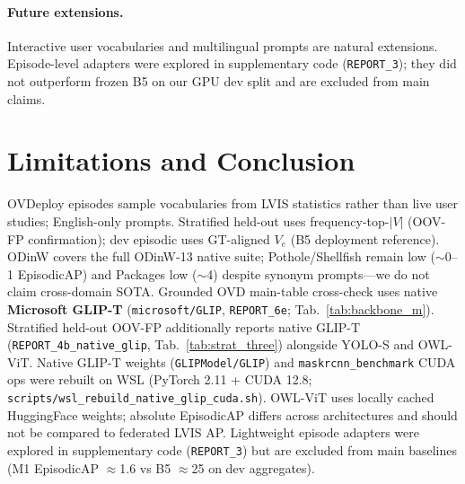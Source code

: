 \documentclass[10pt,twocolumn,letterpaper]{article}
\begin{document}
\begin{table}[t]
\centering
\small

\caption{YOLO-World v2-S vs OWL-ViT-B/32 on OVDeploy dev (GPU v2, \texttt{REPORT\_6}).}
\label{tab:backbone}
\end{table}

\begin{table}[t]
\centering
\scriptsize
\setlength{\tabcolsep}{2pt}
\resizebox{\linewidth}{!}{%
%
}
\caption{YOLO-S vs OWL-ViT vs native GLIP-T (\texttt{REPORT\_6e}) on OVDeploy dev (GPU v2).}
\label{tab:backbone_m}
\end{table}

\paragraph{Future extensions.}
Interactive user vocabularies and multilingual prompts are natural extensions.
Episode-level adapters were explored in supplementary code (\texttt{REPORT\_3}); they did not outperform frozen B5 on our GPU dev split and are excluded from main claims.

\section{Limitations and Conclusion}
\label{sec:lim}

OVDeploy episodes sample vocabularies from LVIS statistics rather than live user studies; English-only prompts.
Stratified held-out uses frequency-top-$|V|$ (OOV-FP confirmation); dev episodic uses GT-aligned $V_e$ (B5 deployment reference).
ODinW covers the full ODinW-13 native suite; Pothole/Shellfish remain low ($\sim$0--1 EpisodicAP) and Packages low ($\sim$4) despite synonym prompts---we do not claim cross-domain SOTA.
Grounded OVD main-table cross-check uses native \textbf{Microsoft GLIP-T} (\texttt{microsoft/GLIP}, \texttt{REPORT\_6e}; Tab.~\ref{tab:backbone_m}).
Stratified held-out OOV-FP additionally reports native GLIP-T (\texttt{REPORT\_4b\_native\_glip}, Tab.~\ref{tab:strat_three}) alongside YOLO-S and OWL-ViT.
Native GLIP-T weights (\texttt{GLIPModel/GLIP}) and \texttt{maskrcnn\_benchmark} CUDA ops were rebuilt on WSL (PyTorch 2.11 + CUDA 12.8; \texttt{scripts/wsl\_rebuild\_native\_glip\_cuda.sh}).
OWL-ViT uses locally cached HuggingFace weights; absolute EpisodicAP differs across architectures and should not be compared to federated LVIS AP.
Lightweight episode adapters were explored in supplementary code (\texttt{REPORT\_3}) but are excluded from main baselines (M1 EpisodicAP $\approx$1.6 vs B5 $\approx$25 on dev aggregates).
\end{document}
